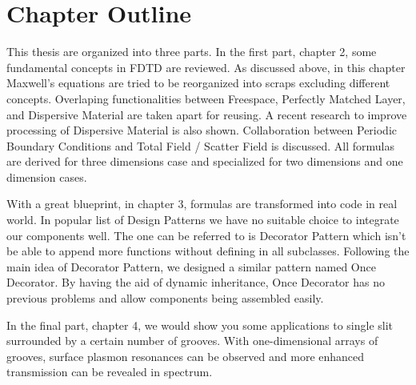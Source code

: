\section{Chapter Outline}
This thesis are organized into three parts. In the first part, chapter 2, some fundamental concepts in FDTD are
reviewed. As discussed above, in this chapter Maxwell's equations are tried to be reorganized into scraps excluding
different concepts. Overlaping functionalities between Freespace, Perfectly Matched Layer, and Dispersive Material are
taken apart for reusing. A recent research to improve processing of Dispersive Material is also shown. Collaboration
between Periodic Boundary Conditions and Total Field / Scatter Field is discussed. All formulas are derived for three
dimensions case and specialized for two dimensions and one dimension cases.

With a great blueprint, in chapter 3, formulas are transformed into code in real world. In popular list of Design
Patterns we have no suitable choice to integrate our components well. The one can be referred to is Decorator Pattern
which isn't be able to append more functions without defining in all subclasses. Following the main idea of Decorator
Pattern, we designed a similar pattern named Once Decorator. By having the aid of dynamic inheritance, Once Decorator
has no previous problems and allow components being assembled easily.

In the final part, chapter 4, we would show you some applications to single slit surrounded by a certain number of
grooves. With one-dimensional arrays of grooves, surface plasmon resonances can be observed and more enhanced
transmission can be revealed in spectrum.
